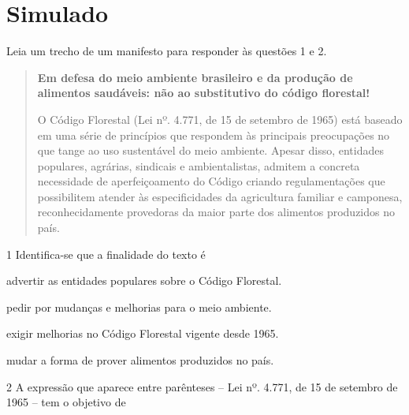 \chapter[Simulado 3]{Simulado}

Leia um trecho de um manifesto para responder às questões 1 e 2.

\begin{quote}
\textbf{Em defesa do meio ambiente brasileiro e da produção de alimentos
saudáveis: não ao substitutivo do código florestal!}


O Código Florestal (Lei nº. 4.771, de 15 de setembro de 1965) está
baseado em uma série de princípios que respondem às principais
preocupações no que tange ao uso sustentável do meio ambiente. Apesar
disso, entidades populares, agrárias, sindicais e ambientalistas,
admitem a concreta necessidade de aperfeiçoamento do Código criando
regulamentações que possibilitem atender às especificidades da
agricultura familiar e camponesa, reconhecidamente provedoras da maior
parte dos alimentos produzidos no país.

\end{quote}

\num{1} Identifica-se que a finalidade do texto é

\begin{escolha}
\item advertir as entidades populares sobre o Código Florestal.

\item pedir por mudanças e melhorias para o meio ambiente.

\item exigir melhorias no Código Florestal vigente desde 1965.

\item mudar a forma de prover alimentos produzidos no país.
\end{escolha}

\num{2} A expressão que aparece entre parênteses -- Lei nº. 4.771, de 15
de setembro de 1965 -- tem o objetivo de


